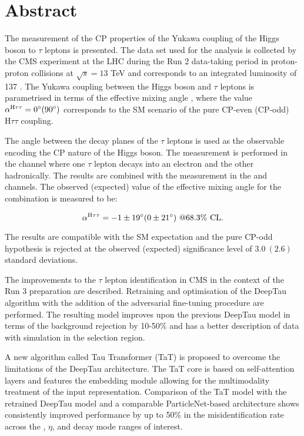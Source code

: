 \thispagestyle{empty}
\vspace{-3cm}
\section*{\centering Abstract}

\noindent

The measurement of the CP properties of the Yukawa coupling of the Higgs boson to $\tau$ leptons is presented. The data set used for the analysis is collected by the CMS experiment at the LHC during the Run 2 data-taking period in proton-proton collisions at $\sqrt{s}=13$ TeV and corresponds to an integrated luminosity of 137 \ifb. The Yukawa coupling between the Higgs boson and $\tau$ leptons is parametrised in terms of the effective mixing angle \mixa, where the value $\alpha^{\text{H}\tau\tau} = 0^\circ (90^\circ)$ corresponds to the SM scenario of the pure CP-even (CP-odd) $\text{H}\tau\tau$ coupling. 

The angle between the decay planes of the $\tau$ leptons is used as the observable encoding the CP nature of the Higgs boson. The measurement is performed in the \et channel where one $\tau$ lepton decays into an electron and the other hadronically. The results are combined with the measurement in the \mt and \tata channels. The observed (expected) value of the effective mixing angle for the combination is measured to be:

\begin{equation}
    \alpha^{\text{H}\tau\tau} = -1 \pm 19^\circ (0 \pm 21^\circ) ~@68.3\% \text{ CL}.
\end{equation}

The results are compatible with the SM expectation and the pure CP-odd hypothesis is rejected at the observed (expected) significance level of $3.0 ~(2.6)$ standard deviations.

The improvements to the $\tau$ lepton identification in CMS in the context of the Run 3 preparation are described. Retraining and optimisation of the DeepTau algorithm with the addition of the adversarial fine-tuning procedure are performed. The resulting model improves upon the previous DeepTau model in terms of the background rejection by 10-50\% and has a better description of data with simulation in the \htt selection region. 

A new algorithm called Tau Transformer (TaT) is proposed to overcome the limitations of the DeepTau architecture. The TaT core is based on self-attention layers and features the embedding module allowing for the multimodality treatment of the input representation. Comparison of the TaT model with the retrained DeepTau model and a comparable ParticleNet-based architecture shows consistently improved performance by up to 50\% in the misidentification rate across the \pt, $\eta$, and decay mode ranges of interest.   



